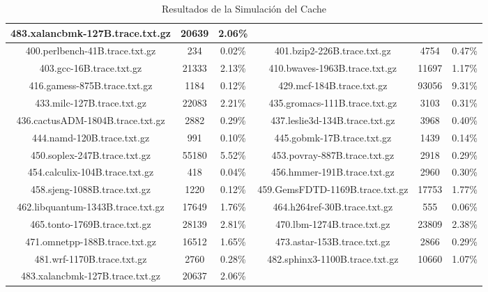 \begin{table}[H]
\begin{tabular}{|c|c|c|c|c|c|}
483.xalancbmk-127B.trace.txt.gz & 20639 & 2.06\% & & & &  \\\hline
400.perlbench-41B.trace.txt.gz & 234 & 0.02\% & 401.bzip2-226B.trace.txt.gz & 4754 & 0.47\% \\\hline
403.gcc-16B.trace.txt.gz & 21333 & 2.13\% & 410.bwaves-1963B.trace.txt.gz & 11697 & 1.17\% \\\hline
416.gamess-875B.trace.txt.gz & 1184 & 0.12\% & 429.mcf-184B.trace.txt.gz & 93056 & 9.31\% \\\hline
433.milc-127B.trace.txt.gz & 22083 & 2.21\% & 435.gromacs-111B.trace.txt.gz & 3103 & 0.31\% \\\hline
436.cactusADM-1804B.trace.txt.gz & 2882 & 0.29\% & 437.leslie3d-134B.trace.txt.gz & 3968 & 0.40\% \\\hline
444.namd-120B.trace.txt.gz & 991 & 0.10\% & 445.gobmk-17B.trace.txt.gz & 1439 & 0.14\% \\\hline
450.soplex-247B.trace.txt.gz & 55180 & 5.52\% & 453.povray-887B.trace.txt.gz & 2918 & 0.29\% \\\hline
454.calculix-104B.trace.txt.gz & 418 & 0.04\% & 456.hmmer-191B.trace.txt.gz & 2960 & 0.30\% \\\hline
458.sjeng-1088B.trace.txt.gz & 1220 & 0.12\% & 459.GemsFDTD-1169B.trace.txt.gz & 17753 & 1.77\% \\\hline
462.libquantum-1343B.trace.txt.gz & 17649 & 1.76\% & 464.h264ref-30B.trace.txt.gz & 555 & 0.06\% \\\hline
465.tonto-1769B.trace.txt.gz & 28139 & 2.81\% & 470.lbm-1274B.trace.txt.gz & 23809 & 2.38\% \\\hline
471.omnetpp-188B.trace.txt.gz & 16512 & 1.65\% & 473.astar-153B.trace.txt.gz & 2866 & 0.29\% \\\hline
481.wrf-1170B.trace.txt.gz & 2760 & 0.28\% & 482.sphinx3-1100B.trace.txt.gz & 10660 & 1.07\% \\\hline
483.xalancbmk-127B.trace.txt.gz & 20637 & 2.06\% & & & &  \\\hline
\hline
\end{tabular}
\caption{Resultados de la Simulación del Cache}
\label{tab:cache_results}
\end{table}